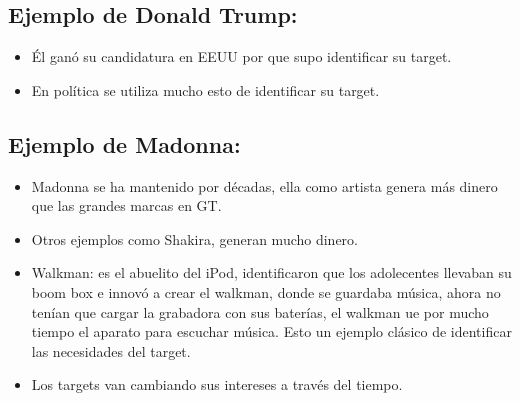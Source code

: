 \subsection{Ejemplo de Donald Trump:}
\begin{itemize}
    \item Él ganó su candidatura en EEUU por que supo identificar su target.
    \item En política se utiliza mucho esto de identificar su target.
\end{itemize}

\subsection{Ejemplo de Madonna:}
\begin{itemize}
    \item Madonna se ha mantenido por décadas, ella como artista genera más dinero que las grandes marcas en GT.
    \item Otros ejemplos como Shakira, generan mucho dinero.
    \item Walkman: es el abuelito del iPod, identificaron que los adolecentes llevaban su boom box e innovó a crear el walkman, donde se guardaba música, ahora no tenían que cargar la grabadora con sus baterías, el walkman ue por mucho tiempo el aparato para escuchar música. Esto un ejemplo clásico de identificar las necesidades del target.
    \item Los targets van cambiando sus intereses a través del tiempo.
\end{itemize}


